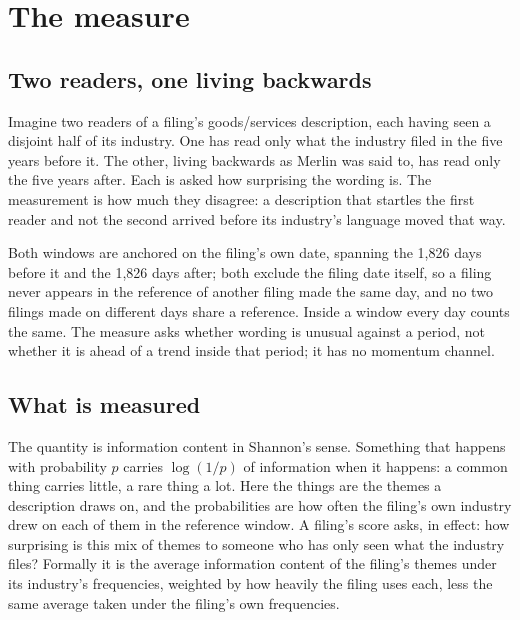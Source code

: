 \section{The measure}\label{sec:measure}\label{sec:construct}

\subsection{Two readers, one living backwards}

Imagine two readers of a filing's goods/services description, each having seen
a disjoint half of its industry. One has read only what the industry filed in
the five years before it. The other, living backwards as Merlin was said to,
has read only the five years after. Each is asked how surprising the wording
is. The measurement is how much they disagree: a description that startles the
first reader and not the second arrived before its industry's language moved
that way.

Both windows are anchored on the filing's own date, spanning the 1,826
days before it
and the 1,826 days after; both exclude the filing date itself, so a filing
never appears in the reference of another filing made the same day, and no
two filings made on different days share a reference. Inside a window every day counts the same. The measure asks whether
wording is unusual against a period, not whether it is ahead of a trend
inside that period; it has no momentum channel.

\subsection{What is measured}

The quantity is information content in Shannon's sense. Something that
happens with probability $p$ carries $\log(1/p)$ of information when it
happens: a common thing carries little, a rare thing a lot. Here the things
are the themes a description draws on, and the probabilities are how often
the filing's own industry drew on each of them in the reference window. A
filing's score asks, in effect: how surprising is this mix of themes to
someone who has only seen what the industry files? Formally it is the
average information content of the filing's themes under its industry's
frequencies, weighted by how heavily the filing uses each, less the same
average taken under the filing's own frequencies.

